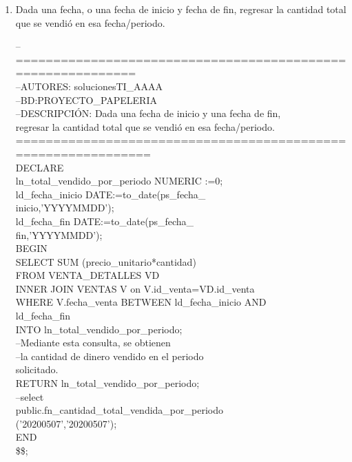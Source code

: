 \documentclass[10pt]{report}
\begin{document}
\begin{enumerate}
\begin{flushleft}
    \end{flushleft}
    
    
    
    
    \item Dada una fecha, o una fecha de inicio y fecha de fin, regresar la cantidad total que se vendió en esa fecha/periodo.
    
    \begin{flushleft} \ttfamily
    --============================================================\\
    --AUTORES: solucionesTI\_AAAA\\
    --BD:PROYECTO\_PAPELERIA\\
    --DESCRIPCIÓN: Dada una fecha de inicio y una fecha de fin,\\ regresar la cantidad total que se vendió en esa fecha/periodo.\\ 
   ==============================================================\\
    DECLARE\\
            ln\_total\_vendido\_por\_periodo NUMERIC :=0;\\
		    ld\_fecha\_inicio   DATE:=to\_date(ps\_fecha\_\\
		    inicio,'YYYYMMDD');\\
		    ld\_fecha\_fin      DATE:=to\_date(ps\_fecha\_\\
		    fin,'YYYYMMDD');\\
    BEGIN\\
	        SELECT SUM (precio\_unitario*cantidad)\\ 
	        FROM VENTA\_DETALLES VD\\
		    INNER JOIN VENTAS V on V.id\_venta=VD.id\_venta\\ 
	        WHERE V.fecha\_venta BETWEEN ld\_fecha\_inicio AND\\ ld\_fecha\_fin\\
	        INTO ln\_total\_vendido\_por\_periodo;\\
	        --Mediante esta consulta, se obtienen \\
	        --la cantidad de dinero vendido en el periodo\\ solicitado.\\
	
	        RETURN ln\_total\_vendido\_por\_periodo;\\
            --select\\ public.fn\_cantidad\_total\_vendida\_por\_periodo\\
            ('20200507','20200507');\\
    END\\
    \$\$;\\


\end{flushleft}
\end{enumerate}
\end{document}
